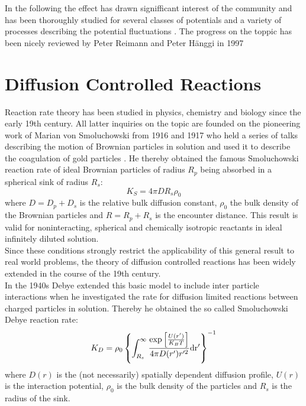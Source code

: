 In the following the effect has drawn signifficant interest of the community and has been thoroughly studied for several classes of potentials and a variety of processes describing the potential fluctuations \cite{Zurcher1993, Pechukas1994, Reimann1995, Reimann1995a}. The progress on the toppic has been nicely reviewed by Peter Reimann and Peter H\"{a}nggi in 1997 \cite{Reimann1997}

\section{Diffusion Controlled Reactions}
Reaction rate theory has been studied in physics, chemistry and biology since the early 19th century. All latter inquiries on the topic are founded on the pioneering work of Marian von Smoluchowski from 1916 and 1917 who held a series of talks \cite{Smoluchowski1916} describing the motion of Brownian particles in solution and used it to describe the coagulation of gold particles \cite{Smoluchowski1917a}. He thereby obtained the famous Smoluchowski reaction rate of ideal Brownian particles of radius $R_p$ being absorbed in a spherical sink of radius $R_s$:\\
\begin{equation}
    K_S = 4 \pi D R_s \rho_0 \nonumber
    \label{Ksintro}
\end{equation}
where $D = D_p + D_s$ is the relative bulk diffusion constant, $\rho_0$ the bulk density of the Brownian particles and $R = R_p + R_s$ is the encounter distance. This result is valid for noninteracting, spherical and chemically isotropic reactants in ideal infinitely diluted solution. \\ 
Since these conditions strongly restrict the applicability of this general result to real world problems, the theory of diffusion controlled reactions has been widely extended in the course of the 19th century.\\
In the 1940s Debye \cite{Debye1942} extended this basic model to include inter particle interactions when he investigated the rate for diffusion limited reactions between charged particles in solution. Thereby he obtained the so called Smoluchowski Debye reaction rate:
\begin{equation}
    K_D = \rho_0\left\{\int_{R_s}^{\infty} \frac{\exp \left[ \frac{U(r')}{K_B T}\right]}{4 \pi D(r') r'^2} \rm d r' \right\}^{-1} \nonumber
    \label{Kdintro}
\end{equation}
where $D(r)$ is the (not necessarily) spatially dependent diffusion profile, $U(r)$ is the interaction potential, $\rho_0$ is the bulk density of the particles and $R_s$ is the radius of the sink. \\
